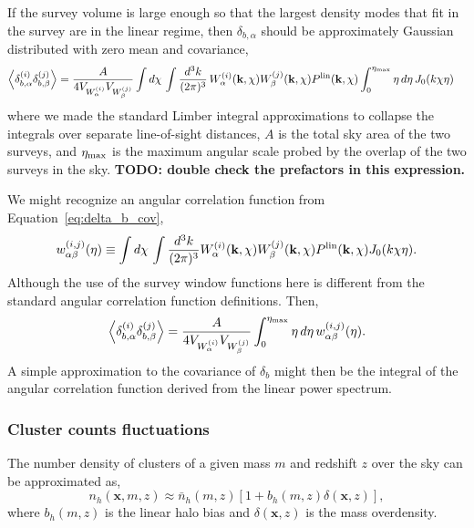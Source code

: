 \documentclass[preprint]{aastex}
\newcommand{\kv}{\mathbf{k}}
\newcommand{\xv}{\mathbf{x}}
\newcommand{\normdist}{\mathcal{N}}
\newcommand{\nbar}{\bar{n}}
\begin{document}
If the survey volume is large enough so that the 
largest density modes that fit in the survey are in the linear regime, 
then $\delta_{b,\alpha}$ should be approximately Gaussian distributed 
with zero mean and covariance,
\begin{align}\label{eq:delta_b_cov}
	\left<\delta_{b,\alpha}^{(i)} \delta_{b,\beta}^{(j)}\right> &=
	\frac{A}{4V_{W_{\alpha}^{(i)}} V_{W_{\beta}^{(j)}}}
	\int d\chi\, 
	\int \frac{d^{3}k}{(2\pi)^3}\,
	W^{(i)}_{\alpha}(\kv, \chi) W^{(j)}_{\beta}(\kv,\chi) P^{\rm lin}(\kv,\chi) 
	\int_{0}^{\eta_{\rm max}} \eta\, d\eta\, J_{0}(k\chi\eta)
\end{align}
where we made the standard Limber integral approximations to collapse the 
integrals over separate line-of-sight distances, $A$ is the total sky area of the 
two surveys, and $\eta_{\rm max}$ is the maximum angular scale probed by the 
overlap of the two surveys in the sky.
{\bf TODO: double check the prefactors in this expression.}

We might recognize an angular correlation function from Equation~\ref{eq:delta_b_cov},
\begin{equation}
	w_{\alpha\beta}^{(i,j)}(\eta) \equiv 
	\int d\chi\, \int \frac{d^3k}{(2\pi)^3}
	W^{(i)}_{\alpha}(\kv, \chi) W^{(j)}_{\beta}(\kv,\chi) P^{\rm lin}(\kv,\chi) J_{0}(k\chi\eta).
\end{equation}
Although the use of the survey window functions here is  different 
from the standard angular correlation function definitions.
Then,
\begin{equation}
	\left<\delta_{b,\alpha}^{(i)} \delta_{b,\beta}^{(j)}\right> =
	\frac{A}{4V_{W_{\alpha}^{(i)}} V_{W_{\beta}^{(j)}}}
	\int_{0}^{\eta_{\rm max}} \eta\,d\eta\, w^{(i,j)}_{\alpha\beta}(\eta).
\end{equation}
A simple approximation to the covariance of $\delta_b$ might then be 
the integral of the angular correlation function derived from the linear 
power spectrum.




\subsubsection{Cluster counts fluctuations}
The number density of clusters of a given mass $m$ and redshift $z$ over the 
sky can be approximated as,
\begin{equation}
	n_{h}(\xv, m, z) \approx \nbar_{h}(m, z)
	\left[1 + b_{h}(m,z) \delta(\xv, z)\right],
\end{equation}
where $b_{h}(m,z)$ is the linear halo bias and
$\delta(\xv,z)$ is the mass overdensity.
\end{document}
